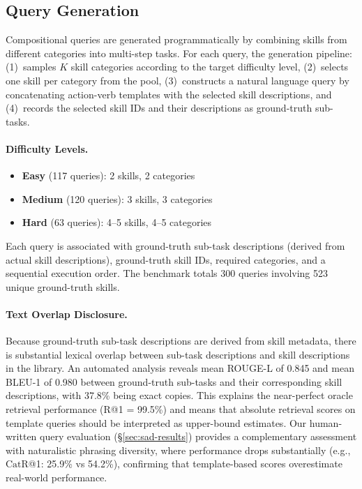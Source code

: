 \documentclass[11pt]{article}
\newcommand{\catrecall}{\text{CatR}}
\begin{document}
\subsection{Query Generation}
\label{sec:querygen}

Compositional queries are generated programmatically by combining skills from different categories into multi-step tasks.
For each query, the generation pipeline: (1)~samples $K$ skill categories according to the target difficulty level, (2)~selects one skill per category from the pool, (3)~constructs a natural language query by concatenating action-verb templates with the selected skill descriptions, and (4)~records the selected skill IDs and their descriptions as ground-truth sub-tasks.

\paragraph{Difficulty Levels.}
\begin{itemize}[nosep,leftmargin=*]
  \item \textbf{Easy} (117 queries): 2 skills, 2 categories
  \item \textbf{Medium} (120 queries): 3 skills, 3 categories
  \item \textbf{Hard} (63 queries): 4--5 skills, 4--5 categories
\end{itemize}

Each query is associated with ground-truth sub-task descriptions (derived from actual skill descriptions), ground-truth skill IDs, required categories, and a sequential execution order.
The benchmark totals 300 queries involving 523 unique ground-truth skills.

\paragraph{Text Overlap Disclosure.}
Because ground-truth sub-task descriptions are derived from skill metadata, there is substantial lexical overlap between sub-task descriptions and skill descriptions in the library.
An automated analysis reveals mean ROUGE-L of 0.845 and mean BLEU-1 of 0.980 between ground-truth sub-tasks and their corresponding skill descriptions, with 37.8\% being exact copies.
This explains the near-perfect oracle retrieval performance (R@1 = 99.5\%) and means that absolute retrieval scores on template queries should be interpreted as upper-bound estimates.
Our human-written query evaluation (\S\ref{sec:sad-results}) provides a complementary assessment with naturalistic phrasing diversity, where performance drops substantially (e.g., $\catrecall$@1: 25.9\% vs 54.2\%), confirming that template-based scores overestimate real-world performance.
\end{document}
